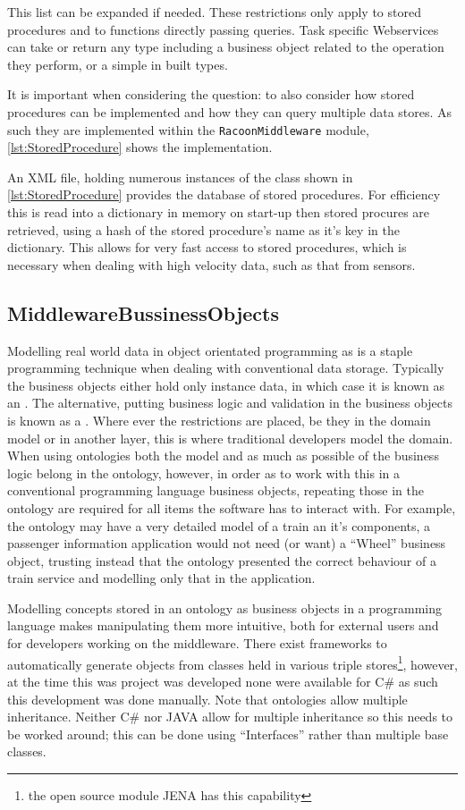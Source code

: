 This list can be expanded if needed. These restrictions only apply to stored procedures and to functions directly passing queries. Task specific Webservices can take or return any type including a business object related to the operation they perform, or a simple in built types.

It is important when considering the question: \say{\QuestionCombine} to also consider how stored procedures can be implemented and how they can query multiple data stores. As such they are implemented within the  \texttt{RacoonMiddleware} module, \autoref{lst:StoredProcedure} shows the implementation.

An XML file, holding numerous instances of the class shown in \autoref{lst:StoredProcedure} provides the database of stored procedures. For efficiency this is read into a dictionary in memory on start-up then stored procures are retrieved, using a hash of the stored procedure's name as it's key in the dictionary. This allows for very fast access to stored procedures, which is necessary when dealing with high velocity data, such as that from sensors.

\subsection{MiddlewareBussinessObjects}
Modelling real world data in object orientated programming as  is a staple programming technique when dealing with conventional data storage. Typically the business objects either hold only instance data, in which case it is known as an . The alternative, putting business logic and validation in the business objects is known as a . Where ever the restrictions are placed, be they in the domain model or in another layer, this is where traditional developers model the domain. When using ontologies both the model and as much as possible of the business logic belong in the ontology, however, in order as to work with this in a conventional programming language business objects, repeating those in the ontology are required for all items the software has to interact with. For example, the ontology may have a very detailed model of a train an it's components, a passenger information application would not need (or want) a ``Wheel'' business object, trusting instead that the ontology presented the correct behaviour of a train service and modelling only that in the application. 

Modelling concepts stored in an ontology as business objects in a programming language makes manipulating them more intuitive, both for external users and for developers working on the middleware. There exist frameworks to automatically generate objects from classes held in various triple stores\footnote{the open source module JENA has this capability}, however, at the time this was project was developed none were available for C\# as such this development was done manually. Note that ontologies allow multiple inheritance. Neither C\# nor JAVA allow for multiple inheritance so this needs to be worked around; this can be done using ``Interfaces'' rather than multiple base classes. 

